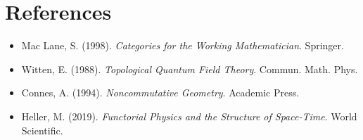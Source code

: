 \documentclass[12pt]{article}
\begin{document}
\section*{References}
\begin{itemize}
    \item Mac Lane, S. (1998). \textit{Categories for the Working Mathematician}. Springer.
    \item Witten, E. (1988). \textit{Topological Quantum Field Theory}. Commun. Math. Phys.
    \item Connes, A. (1994). \textit{Noncommutative Geometry}. Academic Press.
    \item Heller, M. (2019). \textit{Functorial Physics and the Structure of Space-Time}. World Scientific.
\end{itemize}
\end{document}
